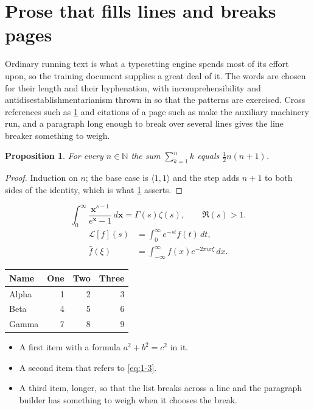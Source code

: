 \documentclass[11pt,a4paper]{report}
\theoremstyle{plain}
\newtheorem{proposition}{Proposition}[chapter]
\newcommand{\vecn}[1]{\mathbf{#1}}
\newcommand{\pairs}[2]{\langle #1,#2\rangle}
\begin{document}
\section{Prose that fills lines and breaks pages}
\label{sec:prose1-3}
Ordinary running text is what a typesetting engine spends most of its effort
upon, so the training document supplies a great deal of it. The words are
chosen for their length and their hyphenation, with incomprehensibility and
antidisestablishmentarianism thrown in so that the patterns are exercised.
Cross references such as \cref{sec:prose1-3} and citations of a page such
as \pageref{sec:prose1-3} make the auxiliary machinery run, and a
paragraph long enough to break over several lines gives the line breaker
something to weigh.
\begin{proposition}\label{prop:1-3}
For every $n\in\mathbb{N}$ the sum $\sum_{k=1}^{n}k$ equals
$\tfrac{1}{2}n(n+1)$.
\end{proposition}
\begin{proof}
Induction on $n$; the base case is $\pairs{1}{1}$ and the step adds $n+1$ to
both sides of the identity, which is what \cref{prop:1-3} asserts.
\end{proof}
\begin{equation}\label{eq:1-3}
  \int_{0}^{\infty}\frac{\vecn{x}^{s-1}}{e^{\vecn{x}}-1}\,d\vecn{x}
    = \Gamma(s)\zeta(s),\qquad \Re(s)>1 .
\end{equation}
\begin{align}
  \mathcal{L}[f](s) &= \int_{0}^{\infty} e^{-st} f(t)\,dt, \\
  \widehat{f}(\xi)  &= \int_{-\infty}^{\infty} f(x) e^{-2\pi i x\xi}\,dx .
\end{align}
\par\noindent\begin{center}
\begin{tabular}{lrrr}
\hline
Name & One & Two & Three \\
\hline
Alpha & 1 & 2 & 3 \\
Beta & 4 & 5 & 6 \\
Gamma & 7 & 8 & 9 \\
\hline
\end{tabular}
\end{center}
\begin{itemize}
  \item A first item with a formula $a^2+b^2=c^2$ in it.
  \item A second item that refers to \eqref{eq:1-3}.
  \item A third item, longer, so that the list breaks across a line and the
    paragraph builder has something to weigh when it chooses the break.
\end{itemize}
\end{document}

